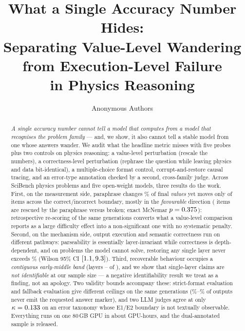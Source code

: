 \documentclass[10pt,letterpaper]{article}
\title{\textbf{What a Single Accuracy Number Hides:\\
Separating Value-Level Wandering from Execution-Level Failure\\
in Physics Reasoning}}
\author{Anonymous Authors}
\date{}
\begin{document}
\maketitle

\begin{abstract}
\emph{A single accuracy number cannot tell a model that computes from a model that
recognises the problem family} --- and, we show, it also cannot tell a stable model
from one whose answers wander. We audit what the headline metric misses with five
probes plus two controls on physics reasoning: a value-level perturbation
(rescale the numbers), a correctness-level perturbation (rephrase the question
while leaving physics and data bit-identical), a multiple-choice format control,
corrupt-and-restore causal tracing, and an error-type annotation checked by a
second, cross-family judge. Across \nbSciBench{} SciBench physics problems and five
open-weight models, three results do the work. First, on the measurement side,
paraphrase changes \pctChangedSevenBWording\% of final \emph{values} yet moves only
\nbWordingFlips{} of \nbWordingCovered{} items across the correct/incorrect
boundary, mostly in the \emph{favourable} direction (\nbWrongToRight{} items are
rescued by the paraphrase versus \nbRightToWrong{} broken; exact McNemar
$p=0.375$): retrospective re-scoring of the same
generations converts what a value-level comparison reports as a large difficulty
effect into a non-significant one with no systematic penalty. Second, on the
mechanism side, output execution and semantic correctness run on different
pathways: parseability is essentially layer-invariant while correctness is
depth-dependent, and on problems the model cannot solve, restoring any single
layer never exceeds \pctAccCleanWrongBest\% (Wilson 95\% CI
$[1.1,9.3]$). Third, recoverable behaviour occupies a
\emph{contiguous early-middle band} (layers \plateauLo--\plateauHi{} of
\nbLayers), and we show that single-layer claims are \emph{not identifiable} at
our sample size --- a negative identifiability result we treat as a finding, not
an apology. Two validity bounds accompany these: strict-format evaluation and
fallback evaluation give different ceilings on the same generations
(\pctNoAnswerCot\%--\pctNoAnswerStruct\% of outputs never emit the requested answer
marker), and two LLM judges agree at only $\kappa=0.133$ on an
error taxonomy whose E1/E2 boundary is not textually observable. Everything runs
on one 80\,GB GPU in about \gpuHoursTotal{} GPU-hours, and the dual-annotated
sample is released.
\end{abstract}
\end{document}
